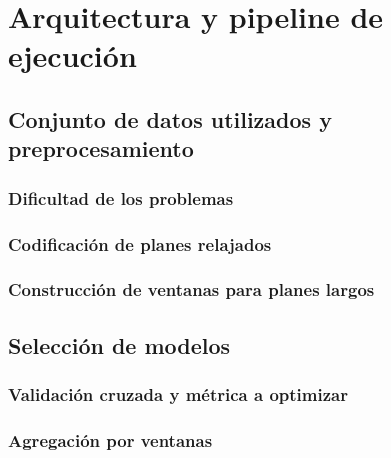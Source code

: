 \chapter{Arquitectura y pipeline de ejecución}
\label{ch:method}

\section{Conjunto de datos utilizados y preprocesamiento}

\subsection{Dificultad de los problemas}

\subsection{Codificación de planes relajados}

\subsection{Construcción de ventanas para planes largos}

\section{Selección de modelos}

\subsection{Validación cruzada y métrica a optimizar}

\subsection{Agregación por ventanas}
